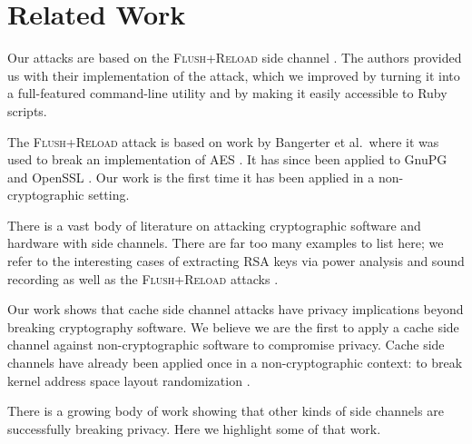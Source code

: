 \documentclass[letterpaper,twocolumn,10pt]{article}
\begin{document}
\section{Related Work}
\label{sec:relwork}

Our attacks are based on the \textsc{Flush+Reload} side channel
\cite{yarom2013flush}. The authors provided us with their implementation of the
attack, which we improved by turning it into a full-featured command-line
utility and by making it easily accessible to Ruby scripts.

The \textsc{Flush+Reload} attack is based on work by Bangerter et al.\ where it
was used to break an implementation of AES \cite{gullasch2011cache}. It has
since been applied to GnuPG \cite{yarom2013flush} and OpenSSL
\cite{benger2014ooh, yarom2014recovering}. Our work is the first time it has
been applied in a non-cryptographic setting.

There is a vast body of literature on attacking cryptographic software and
hardware with side channels. There are far too many examples to list here; we
refer to the interesting cases of extracting RSA keys via power analysis
\cite{messerges1999power} and sound recording \cite{genkin2013rsa} as well as
the \textsc{Flush+Reload} attacks \cite{yarom2013flush, benger2014ooh,
yarom2014recovering}.

Our work shows that cache side channel attacks have privacy implications beyond
breaking cryptography software. We believe we are the first to apply a cache
side channel against non-cryptographic software to compromise privacy. Cache
side channels have already been applied once in a non-cryptographic context: to
break kernel address space layout randomization \cite{hund2013practical}.

There is a growing body of work showing that other kinds of side channels are
successfully breaking privacy. Here we highlight some of that work.
\end{document}
